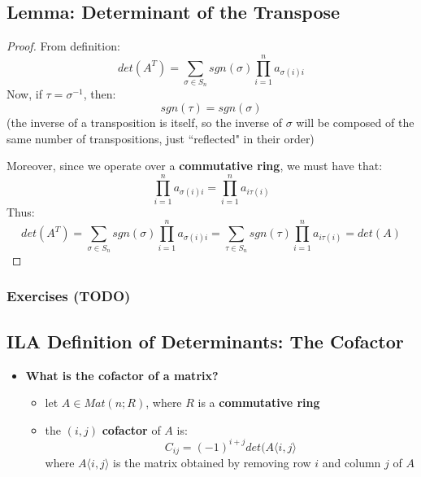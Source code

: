 \documentclass{exam}
\begin{document}

\subsection{Lemma: Determinant of the Transpose}


\begin{proof}

From definition:
\[
det(A^T) = \sum_{\sigma \in S_n} sgn(\sigma)\prod_{i = 1}^n a_{\sigma(i)i}
\]
Now, if $\tau = \sigma^{-1}$, then:
\[
sgn(\tau) = sgn(\sigma)
\]
(the inverse of a transposition is itself, so the inverse of $\sigma$ will be composed of the same number of transpositions, just ``reflected" in their order)


\bigskip

Moreover, since we operate over a \textbf{commutative ring}, we must have that:
\[
\prod_{i = 1}^n a_{\sigma(i)i} = \prod_{i = 1}^n a_{i\tau(i)}
\]
Thus:
\[
det(A^T) = \sum_{\sigma \in S_n} sgn(\sigma)\prod_{i = 1}^n a_{\sigma(i)i} = \sum_{\tau \in S_n} sgn(\tau)\prod_{i = 1}^n a_{i\tau(i)} = det(A)
\]

\end{proof}

\subsubsection{Exercises (TODO)}


\subsection{ILA Definition of Determinants: The Cofactor}

\begin{itemize}
    \item \textbf{What is the cofactor of a matrix?}
    \begin{itemize}
        \item let $A \in Mat(n;R)$, where $R$ is a \textbf{commutative ring}
        \item the $(i,j)$ \textbf{cofactor} of $A$ is:
        \[
        C_{ij} = (-1)^{i+j}det(A\langle i,j \rangle
        \]
        where $A\langle i, j \rangle$ is the matrix obtained by removing row $i$ and column $j$ of $A$
    \end{itemize}
\end{itemize}
\end{document}
